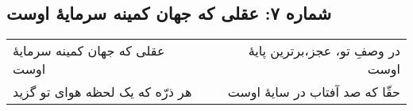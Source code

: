 \begin{center}
\section*{شماره ۷: عقلی که جهان کمینه سرمایۀ اوست}
\label{sec:007}
\begin{longtable}{l p{0.5cm} r}
عقلی که جهان کمینه سرمایهٔ اوست
&&
در وصفِ تو، عجز،‌برترین پایهٔ اوست
\\
هر ذرّه که یک لحظه هوای تو گزید
&&
حقّا که صد آفتاب در سایهٔ اوست
\\
\end{longtable}
\end{center}
